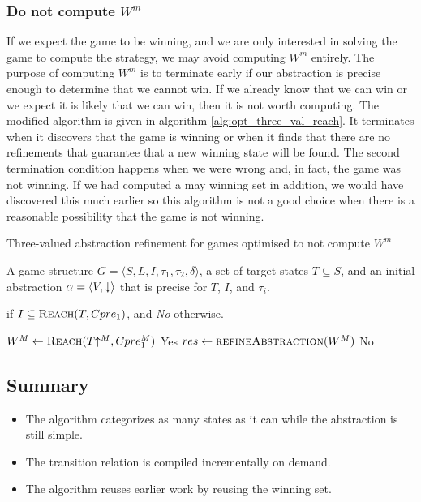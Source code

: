 \subsubsection{Do not compute $W^m$}

If we expect the game to be winning, and we are only interested in solving the game to compute the strategy, we may avoid computing $W^m$ entirely. The purpose of computing $W^m$ is to terminate early if our abstraction is precise enough to determine that we cannot win. If we already know that we can win or we expect it is likely that we can win, then it is not worth computing. The modified algorithm is given in algorithm \ref{alg:opt_three_val_reach}. It terminates when it discovers that the game is winning or when it finds that there are no refinements that guarantee that a new winning state will be found. The second termination condition happens when we were wrong and, in fact, the game was not winning. If we had computed a may winning set in addition, we would have discovered this much earlier so this algorithm is not a good choice when there is a reasonable possibility that the game is not winning.

\begin{algorithm}
\caption{Three-valued abstraction refinement for games optimised to not compute $W^m$}
\label{alg:opt_three_val_reach}

\begin{algorithmic}[1]

\Require A game structure $G = \langle S, L, I, \tau_1, \tau_2, \delta \rangle$, a set 
of target states $T\subseteq S$, and an initial abstraction $\alpha=\langle V, \mathord{\downarrow} \rangle$
that is precise for $T$, $I$, and $\tau_i$.

 if $I \subseteq \textsc{Reach}(T, Cpre_1)$, and {\it No} otherwise.


    \Loop
        \State $W^M \gets \textsc{Reach}(T\mathord{\uparrow^M}, Cpre_1^M)$
            \State\Return Yes
        \Else       
            \State $res \gets \Call{refineAbstraction}{W^M}$
                \State\Return No
            \EndIf
        \EndIf
    \EndLoop
\EndFunction

\end{algorithmic}
\end{algorithm}

\subsection{Summary}
\begin{itemize}
    \item The algorithm categorizes as many states as it can while the abstraction is still simple.
    \item The transition relation is compiled incrementally on demand.
    \item The algorithm reuses earlier work by reusing the winning set.
\end{itemize}

